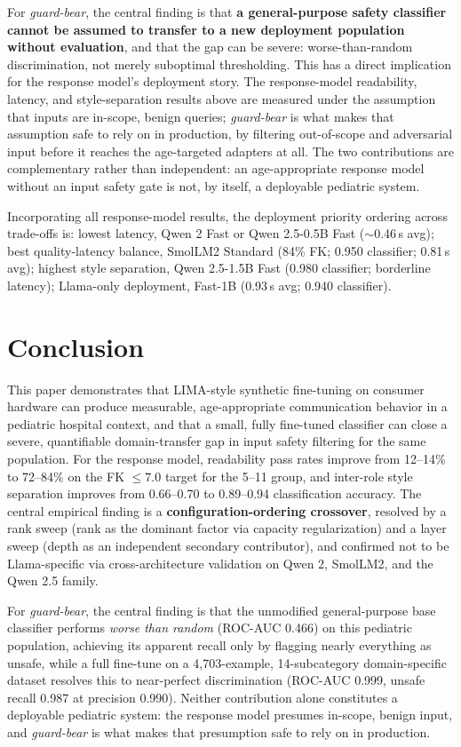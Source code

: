 \documentclass[pdflatex,sn-mathphys-num]{sn-jnl}%
\begin{document}
For \textit{guard-bear}, the central finding is that \textbf{a general-purpose safety classifier cannot be assumed to transfer to a new deployment population without evaluation}, and that the gap can be severe: worse-than-random discrimination, not merely suboptimal thresholding. This has a direct implication for the response model's deployment story. The response-model readability, latency, and style-separation results above are measured under the assumption that inputs are in-scope, benign queries; \textit{guard-bear} is what makes that assumption safe to rely on in production, by filtering out-of-scope and adversarial input before it reaches the age-targeted adapters at all. The two contributions are complementary rather than independent: an age-appropriate response model without an input safety gate is not, by itself, a deployable pediatric system.

Incorporating all response-model results, the deployment priority ordering across trade-offs is: lowest latency, Qwen 2 Fast or Qwen 2.5-0.5B Fast ($\sim$0.46\,s avg); best quality-latency balance, SmolLM2 Standard (84\% FK; 0.950 classifier; 0.81\,s avg); highest style separation, Qwen 2.5-1.5B Fast (0.980 classifier; borderline latency); Llama-only deployment, Fast-1B (0.93\,s avg; 0.940 classifier).

\section{Conclusion}\label{sec:conclusion}

This paper demonstrates that LIMA-style synthetic fine-tuning on consumer hardware can produce measurable, age-appropriate communication behavior in a pediatric hospital context, and that a small, fully fine-tuned classifier can close a severe, quantifiable domain-transfer gap in input safety filtering for the same population. For the response model, readability pass rates improve from 12--14\% to 72--84\% on the FK $\leq 7.0$ target for the 5--11 group, and inter-role style separation improves from 0.66--0.70 to 0.89--0.94 classification accuracy. The central empirical finding is a \textbf{configuration-ordering crossover}, resolved by a rank sweep (rank as the dominant factor via capacity regularization) and a layer sweep (depth as an independent secondary contributor), and confirmed not to be Llama-specific via cross-architecture validation on Qwen 2, SmolLM2, and the Qwen 2.5 family.

For \textit{guard-bear}, the central finding is that the unmodified general-purpose base classifier performs \textit{worse than random} (ROC-AUC 0.466) on this pediatric population, achieving its apparent recall only by flagging nearly everything as unsafe, while a full fine-tune on a 4{,}703-example, 14-subcategory domain-specific dataset resolves this to near-perfect discrimination (ROC-AUC 0.999, unsafe recall 0.987 at precision 0.990). Neither contribution alone constitutes a deployable pediatric system: the response model presumes in-scope, benign input, and \textit{guard-bear} is what makes that presumption safe to rely on in production.
\end{document}
